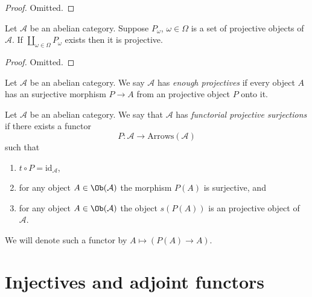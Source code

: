 \begin{proof}
Omitted.
\end{proof}

\begin{lemma}
\label{lemma-coproduct-projectives}
Let $\mathcal{A}$ be an abelian category.
Suppose $P_\omega$, $\omega \in \Omega$ is a set of projective
objects of $\mathcal{A}$. If $\coprod_{\omega \in \Omega} P_\omega$
exists then it is projective.
\end{lemma}

\begin{proof}
Omitted.
\end{proof}

\begin{definition}
\label{definition-enough-projectives}
Let $\mathcal{A}$ be an abelian category.
We say $\mathcal{A}$ has {\it enough projectives}
if every object $A$ has an surjective morphism
$P \to A$ from an projective object $P$ onto it.
\end{definition}

\begin{definition}
\label{definition-functorial-projective-surjections}
Let $\mathcal{A}$ be an abelian category.
We say that $\mathcal{A}$ has {\it functorial projective surjections}
if there exists a functor
$$
P : \mathcal{A} \longrightarrow \text{Arrows}(\mathcal{A})
$$
such that
\begin{enumerate}
\item $t \circ P = \text{id}_\mathcal{A}$,
\item for any object $A \in \Ob(\mathcal{A})$
the morphism $P(A)$ is surjective, and
\item for any object $A \in \Ob(\mathcal{A})$
the object $s(P(A))$ is an projective object of $\mathcal{A}$.
\end{enumerate}
We will denote such a functor by
$A \mapsto (P(A) \to A)$.
\end{definition}

















\section{Injectives and adjoint functors}
\label{section-adjoint}

